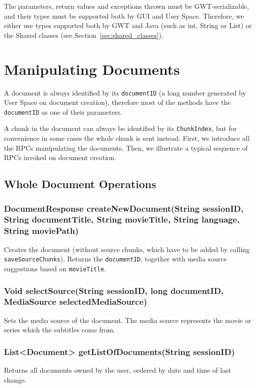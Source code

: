 The parameters, return values and exceptions thrown must be GWT-serializable, and their types must be supported both by GUI and User Space. Therefore, we either use types supported both by GWT and Java (such as int, String or List) or the Shared classes (see Section~\ref{sec:shared_classes}).

\section{Manipulating Documents}
\label{sec:rpc:doc}

A document is always identified by its {\tt documentID} (a long number generated by User Space on document creation), therefore most of the methods have the {\tt documentID} as one of their parameters.

A chunk in the document can always be identified by its {\tt ChunkIndex}, but for convenience in some cases the whole chunk is sent instead.
First, we introduce all the RPCs manipulating the documents. Then, we illustrate a typical sequence of RPCs invoked on document creation.

\subsection{Whole Document Operations}

\subsubsection{DocumentResponse createNewDocument(String sessionID, String documentTitle, String movieTitle, String language, String moviePath)}

Creates the document
(without source chunks, which have to be added by calling {\tt saveSourceChunks}).
Returns the {\tt documentID}, together with media source suggestions based on {\tt movieTitle}.
     	
\subsubsection{Void selectSource(String sessionID, long documentID, MediaSource selectedMediaSource)}
Sets the media source of the document. The media source represents the movie or series which the subtitles come from.

\subsubsection{List<Document> getListOfDocuments(String sessionID)}
Returns all documents owned by the user, ordered by date and time of last change.

